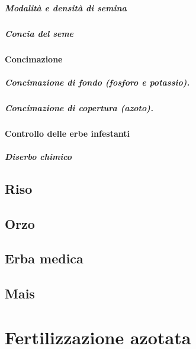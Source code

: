 \documentclass[
]{book}
\theoremstyle{definition}
\theoremstyle{definition}
\theoremstyle{definition}
\theoremstyle{definition}
\theoremstyle{remark}
\begin{document}
\hypertarget{modalituxe0-e-densituxe0-di-semina}{%
\subparagraph{Modalità e densità di semina}\label{modalituxe0-e-densituxe0-di-semina}}

\hypertarget{concia-del-seme}{%
\subparagraph{Concia del seme}\label{concia-del-seme}}

\hypertarget{concimazione}{%
\paragraph{Concimazione}\label{concimazione}}

\hypertarget{concimazione-di-fondo-fosforo-e-potassio.}{%
\subparagraph{Concimazione di fondo (fosforo e potassio).}\label{concimazione-di-fondo-fosforo-e-potassio.}}

\hypertarget{concimazione-di-copertura-azoto.}{%
\subparagraph{Concimazione di copertura (azoto).}\label{concimazione-di-copertura-azoto.}}

\hypertarget{controllo-delle-erbe-infestanti}{%
\paragraph{Controllo delle erbe infestanti}\label{controllo-delle-erbe-infestanti}}

\hypertarget{diserbo-chimico}{%
\subparagraph{Diserbo chimico}\label{diserbo-chimico}}

\hypertarget{riso}{%
\subsection{Riso}\label{riso}}

\hypertarget{orzo}{%
\subsection{Orzo}\label{orzo}}

\hypertarget{erba-medica}{%
\subsection{Erba medica}\label{erba-medica}}

\hypertarget{mais}{%
\subsection{Mais}\label{mais}}

\hypertarget{fertilizzazione-azotata}{%
\section{Fertilizzazione azotata}\label{fertilizzazione-azotata}}
\end{document}
